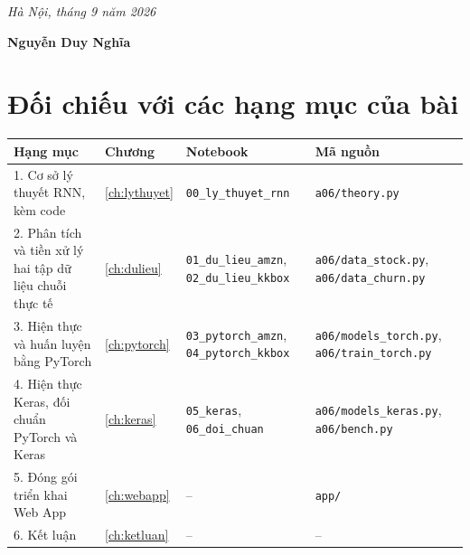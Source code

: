 \vspace{8mm}
\begin{flushright}
\emph{Hà Nội, tháng 9 năm 2026}\par
\vspace{2mm}
\textbf{Nguyễn Duy Nghĩa}
\end{flushright}

\section*{Đối chiếu với các hạng mục của bài}

\begin{table}[H]
  \centering
  \small
  \begin{tabular}{L{4.4cm}L{1.3cm}L{4.2cm}L{4.2cm}}
    \toprule
    Hạng mục & Chương & Notebook & Mã nguồn \\
    . Cơ sở lý thuyết RNN, kèm code & \ref{ch:lythuyet} & \texttt{00\_ly\_thuyet\_rnn} & \texttt{a06/theory.py} \\
    2. Phân tích và tiền xử lý hai tập dữ liệu chuỗi thực tế & \ref{ch:dulieu} & \texttt{01\_du\_lieu\_amzn}, \texttt{02\_du\_lieu\_kkbox} & \texttt{a06/data\_stock.py}, \texttt{a06/data\_churn.py} \\
    3. Hiện thực và huấn luyện bằng PyTorch & \ref{ch:pytorch} & \texttt{03\_pytorch\_amzn}, \texttt{04\_pytorch\_kkbox} & \texttt{a06/models\_torch.py}, \texttt{a06/train\_torch.py} \\
    4. Hiện thực Keras, đối chuẩn PyTorch và Keras & \ref{ch:keras} & \texttt{05\_keras}, \texttt{06\_doi\_chuan} & \texttt{a06/models\_keras.py}, \texttt{a06/bench.py} \\
    5. Đóng gói triển khai Web App & \ref{ch:webapp} & -- & \texttt{app/} \\
    6. Kết luận & \ref{ch:ketluan} & -- & -- \\
    \bottomrule
  \end{tabular}
\end{table}
